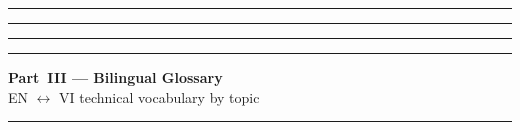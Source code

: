 \documentclass[a4paper,10pt]{extarticle}
\begin{document}
\vfill\hrule\vspace{4pt}



\vfill\hrule\vspace{4pt}



\vfill\hrule\vspace{4pt}



\vfill\hrule\vspace{4pt}



\clearpage
\begin{center}
\textbf{\large Part~III — Bilingual Glossary} \\[1pt]
\footnotesize EN $\leftrightarrow$ VI technical vocabulary by topic
\end{center}
\vspace{-6pt}\hrule\vspace{4pt}


\end{document}
